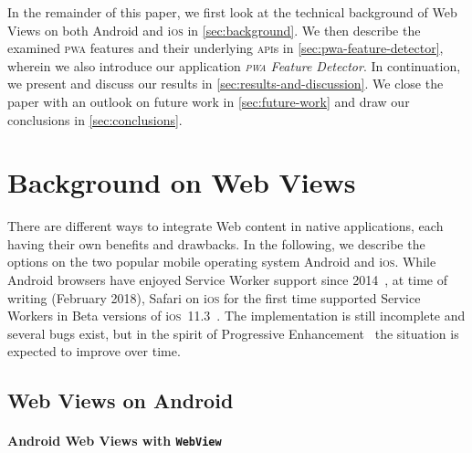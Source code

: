 \documentclass[sigconf]{acmart}
\begin{document}
In the remainder of this paper, we first look at the technical background of Web Views
on both Android and i\textsc{os} in \autoref{sec:background}.
We then describe the examined \textsc{pwa} features and their underlying \textsc{api}s
in \autoref{sec:pwa-feature-detector}, wherein we also introduce
our application \emph{\textsc{pwa} Feature Detector}.
In continuation, we present and discuss our results in \autoref{sec:results-and-discussion}.
We close the paper with an outlook on future work in \autoref{sec:future-work}
and draw our conclusions in \autoref{sec:conclusions}.

\section{Background on Web Views}
\label{sec:background}

There are different ways to integrate Web content in native applications,
each having their own benefits and drawbacks.
In the following, we describe the options on the two popular
mobile operating system Android and i\textsc{os}.
While Android browsers have enjoyed Service Worker support since 2014~\cite{cooney2014chromium},
at time of writing (February 2018), Safari on i\textsc{os}
for the first time supported Service Workers
in Beta versions of i\textsc{os}~11.3~\cite{mondello2018safari}.
The implementation is still incomplete and several bugs exist, but in the spirit of
Progressive Enhancement~\cite{champeon2003progressiveenhancement}
the situation is expected to improve over time.

\subsection{Web Views on Android}

\paragraph{Android Web Views with \texttt{WebView}}
\end{document}
